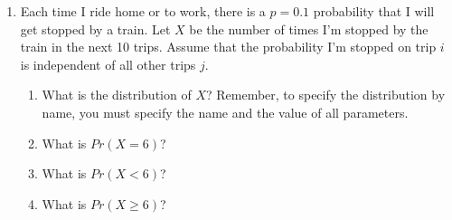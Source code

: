 \documentclass[]{book}
\providecommand{\tightlist}{%
  \setlength{\itemsep}{0pt}\setlength{\parskip}{0pt}}
\begin{document}
\begin{enumerate}
\def\labelenumi{\arabic{enumi}.}
\setcounter{enumi}{9}
\tightlist
\item
  Each time I ride home or to work, there is a \(p=0.1\) probability
  that I will get stopped by a train. Let \(X\) be the number of times
  I'm stopped by the train in the next 10 trips. Assume that the
  probability I'm stopped on trip \(i\) is independent of all other
  trips \(j\).

  \begin{enumerate}
  \def\labelenumii{\alph{enumii})}
  \tightlist
  \item
    What is the distribution of \(X\)? Remember, to specify the
    distribution by name, you must specify the name and the value of all
    parameters.
  \item
    What is \(Pr(X =6)\)?
  \item
    What is \(Pr(X < 6)\)?
  \item
    What is \(Pr(X \ge 6)\)?
  \end{enumerate}
\end{enumerate}


\end{document}
